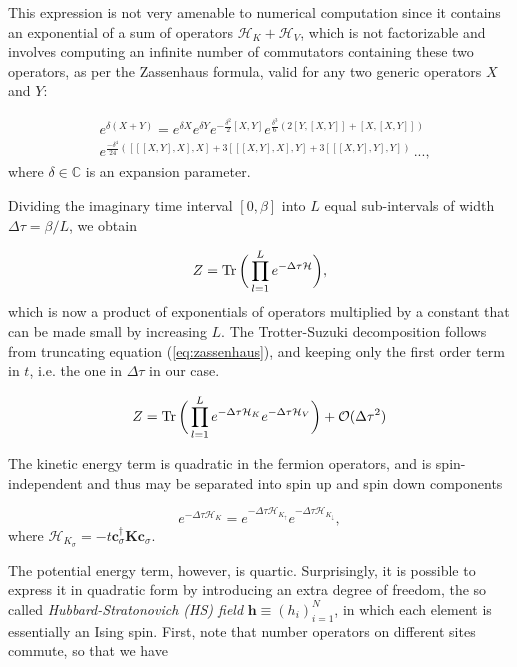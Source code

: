 This expression is not very amenable to numerical computation since it contains an exponential of a sum of operators $\mathcal{H}_K + \mathcal{H}_V$, which is not factorizable and involves computing an infinite number of commutators containing these two operators, as per the Zassenhaus formula, valid for any two generic operators $X$ and $Y$:

\begin{equation}\label{eq:zassenhaus}
\begin{split}
&e^{\delta (X+Y)}=e^{\delta X} e^{\delta Y} e^{-{\frac {\delta^{2}}{2}}[X,Y]} e^{{\frac {\delta^{3}}{6}}(2[Y,[X,Y]]+[X,[X,Y]])} \\
&e^{{\frac {-\delta^{4}}{24}}([[[X,Y],X],X]+3[[[X,Y],X],Y]+3[[[X,Y],Y],Y])} \, ... , 
\end{split}
\end{equation}
where $\delta \in \mathbb{C}$ is an expansion parameter.

Dividing the imaginary time interval $[0, \beta ]$ into $L$ equal sub-intervals of width $\Delta \tau = \beta / L$, we obtain

\begin{equation}
Z = \operatorname{Tr} \bigg( \prod_{l=1}^L e^{-\Delta\tau \mathcal{H} } \bigg) ,
\end{equation}
which is now a product of exponentials of operators multiplied by a constant that can be made small by increasing $L$. The Trotter-Suzuki decomposition follows from truncating equation (\ref{eq:zassenhaus}), and keeping only the first order term in $t$, i.e. the one in $\Delta \tau$ in our case.

\begin{equation}\label{eq:Z_propagator}
Z = \operatorname{Tr} \bigg( \prod_{l=1}^L e^{-\Delta\tau \mathcal{H}_K } e^{-\Delta\tau \mathcal{H}_V } \bigg) + \mathcal{O}(\Delta \tau^2) 
\end{equation}

The kinetic energy term is quadratic in the fermion operators, and is spin-independent and thus may be separated into spin up and spin down components

\begin{equation}
e^{-\Delta\tau \mathcal{H}_K} = e^{-\Delta\tau \mathcal{H}_{K_\uparrow}} e^{-\Delta\tau \mathcal{H}_{K_\downarrow}} ,
\end{equation}
where $\mathcal{H}_{K_\sigma} = -t \bm c_\sigma^\dagger \bm K  \bm c_\sigma$.

The potential energy term, however, is quartic. Surprisingly, it is possible to express it in quadratic form by introducing an extra degree of freedom, the so called \emph{Hubbard-Stratonovich (HS) field} $\bm h \equiv (h_i)_{i=1}^N$, in which each element is essentially an Ising spin. First, note that number operators on different sites commute, so that we have


